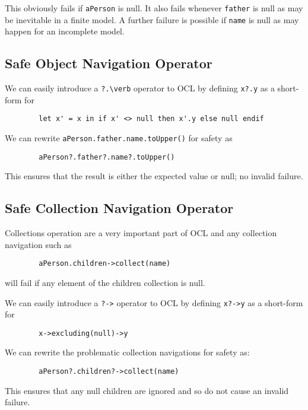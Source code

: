 \documentclass{llncs}
\begin{document}
This obviously fails if \verb|aPerson| is null. It also fails whenever \verb|father| is null as may be inevitable in a finite model. A further failure is possible if \verb|name| is null as may happen for an incomplete model.

\subsection{Safe Object Navigation Operator}

We can easily introduce a \verb|?.\verb| operator to OCL by defining \verb|x?.y| as a short-form for 

\begin{verbatim}
        let x' = x in if x' <> null then x'.y else null endif
\end{verbatim}

We can rewrite \verb|aPerson.father.name.toUpper()| for safety as

\begin{verbatim}
        aPerson?.father?.name?.toUpper()
\end{verbatim}

This ensures that the result is either the expected value or null; no invalid failure.

\subsection{Safe Collection Navigation Operator}

Collections operation are a very important part of OCL and any collection navigation such as 
\begin{verbatim}
        aPerson.children->collect(name)
\end{verbatim}
will fail if any element of the children collection is null.

We can easily introduce a \verb|?->| operator to OCL by defining \verb|x?->y| as a short-form for 

\begin{verbatim}
        x->excluding(null)->y
\end{verbatim}

We can rewrite the problematic collection navigations for safety as:

\begin{verbatim}
        aPerson?.children?->collect(name)
\end{verbatim}

This ensures that any null children are ignored and so do not cause an invalid failure.
\end{document}
